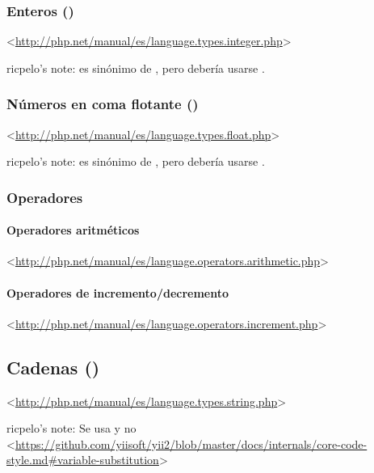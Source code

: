\documentclass[a4paper,11pt,spanish]{sphinxmanual}
\begin{document}
\subsubsection{Enteros ()}
\label{\detokenize{php:enteros-int}}
\textless{}\url{http://php.net/manual/es/language.types.integer.php}\textgreater{}

ricpelo's note:  es sinónimo de , pero debería usarse
.


\subsubsection{Números en coma flotante ()}
\label{\detokenize{php:numeros-en-coma-flotante-float}}
\textless{}\url{http://php.net/manual/es/language.types.float.php}\textgreater{}

ricpelo's note:  es sinónimo de , pero debería usarse
.


\subsubsection{Operadores}
\label{\detokenize{php:operadores}}

\paragraph{Operadores aritméticos}
\label{\detokenize{php:operadores-aritmeticos}}
\textless{}\url{http://php.net/manual/es/language.operators.arithmetic.php}\textgreater{}


\paragraph{Operadores de incremento/decremento}
\label{\detokenize{php:operadores-de-incremento-decremento}}
\textless{}\url{http://php.net/manual/es/language.operators.increment.php}\textgreater{}


\subsection{Cadenas ()}
\label{\detokenize{php:cadenas-string}}
\textless{}\url{http://php.net/manual/es/language.types.string.php}\textgreater{}

ricpelo's note: Se usa  y no
 \textless{}\url{https://github.com/yiisoft/yii2/blob/master/docs/internals/core-code-style.md\#variable-substitution}\textgreater{}
\end{document}
